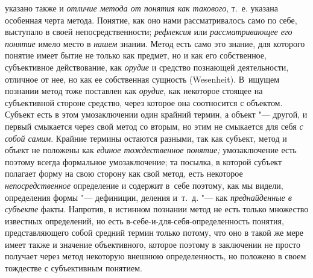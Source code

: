 указано также и {\em отличие метода от понятия как
такового}, т.~е. указана особенная черта метода. Понятие,
как оно нами рассматривалось само по себе, выступало в своей
непосредственности; {\em рефлексия} или {\em рассматривающее
его понятие} имело место в {\em нашем} знании. Метод
есть само это знание, для которого понятие имеет бытие не только как
предмет, но и как его собственное, субъективное действование, как
{\em орудие} и средство
познающей деятельности, отличное от нее, но как ее собственная сущность
(Wesenheit). В~ищущем познании метод тоже поставлен как {\em орудие}, как
некоторое стоящее на субъективной стороне средство, через которое она
соотносится с объектом. Субъект есть в этом умозаключении один крайний
термин, а объект "--- другой, и первый смыкается через свой
метод со вторым, но этим не смыкается для себя {\em с собой самим}.
Крайние термины остаются разными, так как субъект, метод и
объект не положены как {\em единое
тождественное понятие;} умозаключение есть поэтому всегда
формальное умозаключение; та посылка, в которой субъект полагает форму на
свою сторону как свой метод, есть некоторое {\em непосредственное}
определение и содержит в~себе поэтому, как мы видели, определения
формы "--- дефиниции, деления и~т.~д. "--- как {\em преднайденные в
субъекте} факты. Напротив, в истинном познании метод не есть
только множество известных определений, но есть
в-себе-и-для-себя-определенность понятия, представляющего собой средний
термин только потому, что оно в такой же мере имеет также и значение
объективного, которое поэтому в заключении не просто получает через метод
некоторую внешнюю определенность, но положено в своем тождестве с
субъективным понятием.

